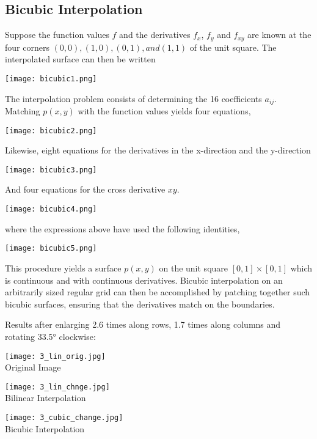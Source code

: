 \documentclass[10pt]{article}
\begin{document}
\subsection{Bicubic Interpolation}
Suppose the function values $f$ and the derivatives $f_{x}$, $f_y$ and $f_{xy}$ are known at the four corners $(0,0), (1,0), (0,1), and (1,1)$ of the unit square. The interpolated surface can then be written
\begin{center}
\texttt{[image: bicubic1.png]}\\
\end{center}
The interpolation problem consists of determining the 16 coefficients $a_{ij}$. Matching $p(x,y)$ with the function values yields four equations,
\begin{center}
\texttt{[image: bicubic2.png]}\\
\end{center}
Likewise, eight equations for the derivatives in the x-direction and the y-direction
\begin{center}
\texttt{[image: bicubic3.png]}\\
\end{center}
And four equations for the cross derivative $xy$.
\begin{center}
\texttt{[image: bicubic4.png]}\\
\end{center}
where the expressions above have used the following identities,
\begin{center}
\texttt{[image: bicubic5.png]}\\
\end{center}
This procedure yields a surface $p(x,y)$ on the unit square $[0,1] \times [0,1]$ which is continuous and with continuous derivatives. Bicubic interpolation on an arbitrarily sized regular grid can then be accomplished by patching together such bicubic surfaces, ensuring that the derivatives match on the boundaries.

Results after enlarging 2.6 times along rows, 1.7 times along columns and rotating \ang{33.5} clockwise:
\begin{center}
\texttt{[image: 3\_lin\_orig.jpg]}\\Original Image
\end{center}
\begin{center}
\texttt{[image: 3\_lin\_chnge.jpg]}\\Bilinear Interpolation
\end{center}
\begin{center}
\texttt{[image: 3\_cubic\_change.jpg]}\\Bicubic Interpolation
\end{center}
\end{document}
